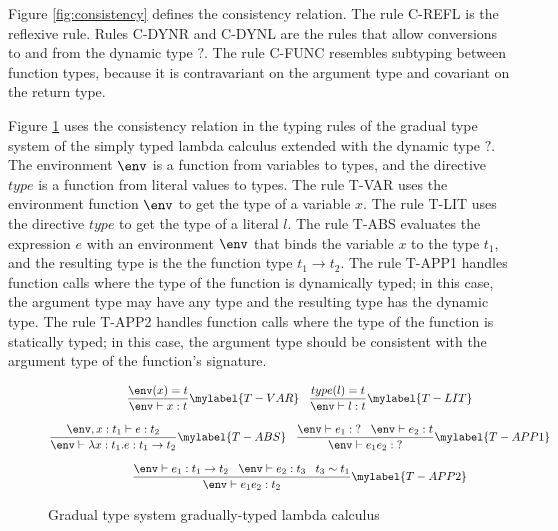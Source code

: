 Figure \ref{fig:consistency} defines the consistency relation.
The rule \textsc{C-REFL} is the reflexive rule.
Rules \textsc{C-DYNR} and \textsc{C-DYNL} are the rules that allow
conversions to and from the dynamic type $?$.
The rule \textsc{C-FUNC} resembles subtyping between function types,
because it is contravariant on the argument type and covariant on the
return type.

Figure \ref{fig:gts} uses the consistency relation in the typing rules
of the gradual type system of the simply typed lambda calculus extended
with the dynamic type $?$.
The environment $\env$ is a function from variables to types, and
the directive $type$ is a function from literal values to types.
The rule \textsc{T-VAR} uses the environment function $\env$ to get the
type of a variable $x$.
The rule \textsc{T-LIT} uses the directive $type$ to get the type of
a literal $l$.
The rule \textsc{T-ABS} evaluates the expression $e$ with an environment
$\env$ that binds the variable $x$ to the type $t_{1}$, and the resulting
type is the the function type $t_{1} \rightarrow t_{2}$.
The rule \textsc{T-APP1} handles function calls where the type of the
function is dynamically typed; in this case, the argument type may have
any type and the resulting type has the dynamic type.
The rule \textsc{T-APP2} handles function calls where the type of the
function is statically typed; in this case, the argument type should
be consistent with the argument type of the function's signature.

\begin{figure}[!ht]
\dstart
$$
\begin{matrix}
\dfrac{\env(x) = t}
      {\env \vdash x:t} \mylabel{T-VAR}
\;\;\;
\dfrac{type(l) = t}
      {\env \vdash l:t} \mylabel{T-LIT}
\\ \\
\dfrac{\env, x:t_{1} \vdash e:t_{2}}
      {\env \vdash \lambda x:t_{1}.e:t_{1} \rightarrow t_{2}} \mylabel{T-ABS}
\;\;\;
\dfrac{\env \vdash e_{1}:\;? \;\;\;
       \env \vdash e_{2}:t}
      {\env \vdash e_{1} e_{2}:\;?} \mylabel{T-APP1}
\\ \\
\dfrac{\env \vdash e_{1}:t_{1} \rightarrow t_{2} \;\;\;
       \env \vdash e_{2}:t_{3} \;\;\;
       t_{3} \sim t_{1}}
      {\env \vdash e_{1} e_{2}:t_{2}} \mylabel{T-APP2}
\end{matrix}
$$
\dend
\caption{Gradual type system gradually-typed lambda calculus}
\label{fig:gts}
\end{figure}

